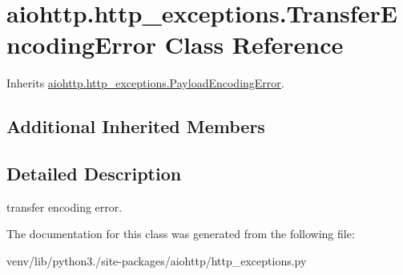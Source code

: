 \hypertarget{classaiohttp_1_1http__exceptions_1_1_transfer_encoding_error}{}\section{aiohttp.\+http\+\_\+exceptions.\+Transfer\+Encoding\+Error Class Reference}
\label{classaiohttp_1_1http__exceptions_1_1_transfer_encoding_error}


Inherits \hyperlink{classaiohttp_1_1http__exceptions_1_1_payload_encoding_error}{aiohttp.\+http\+\_\+exceptions.\+Payload\+Encoding\+Error}.

\subsection*{Additional Inherited Members}


\subsection{Detailed Description}
\begin{DoxyVerb}transfer encoding error.\end{DoxyVerb}
 

The documentation for this class was generated from the following file\+:\begin{DoxyCompactItemize}
\item 
venv/lib/python3./site-\/packages/aiohttp/http\+\_\+exceptions.\+py\end{DoxyCompactItemize}
